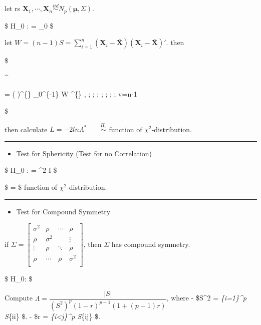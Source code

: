 \documentclass[
]{book}
\providecommand{\tightlist}{%
  \setlength{\itemsep}{0pt}\setlength{\parskip}{0pt}}
\begin{document}
{{{let rs \(\pmb X_1 , \cdots, \pmb X_n \overset {iid} {\sim} N_p (\pmb \mu , \Sigma)\).

\$
H\_0 : \Sigma = \Sigma\_0
\$

let \(W = (n-1)S = \sum_{i=1}^n (\pmb X_i - \bar {\pmb X})(\pmb X_i - \bar {\pmb X})'\). then

\$

\Lambda\^{}\ast 

= \left(  \right)\^{}\{\} \lvert \Sigma\_0\^{}\{-1\} W \rvert\^{}\{\} \exp {}, ; ; ; ; ; ; ; v=n-1

\$

then calculate \(L=-2 ln \Lambda^\ast \; \; \; \; \; \; \; \overset {H_0}{\sim}\) function of \(\chi^2\)-distribution.

\begin{center}\rule{0.5\linewidth}{0.5pt}\end{center}

\begin{itemize}
\tightlist
\item
  Test for Sphericity (Test for no Correlation)
\end{itemize}

\$
H\_0 : \Sigma = \sigma\^{}2 I
\$

\$ \Lambda =   \$ function of \(\chi^2\)-distribution.

\begin{center}\rule{0.5\linewidth}{0.5pt}\end{center}

\begin{itemize}
\tightlist
\item
  Test for Compound Symmetry
\end{itemize}

if \(\Sigma = \begin{bmatrix} \sigma^2 & \rho & \cdots & \rho \\\rho & \sigma^2 & & \vdots \\ \vdots & \rho & \ddots & \rho \\ \rho & \cdots & \rho & \sigma^2 \\ \end{bmatrix}\), then \(\Sigma\) has compound symmetry.

\$
H\_0: \Sigma {}
\$

Compute \(\Lambda = \dfrac{\vert S \vert} {(S^2)^p (1-r)^{p-1} (1+ (p-1)r)}\), where
- \$S\^{}2 = \sum\emph{\{i=1\}\^{}p S}\{ii\} \$.
- \$r =   \sum\emph{\{i\textless j\}\^{}p S}\{ij\} \$.

}}}
\end{document}
